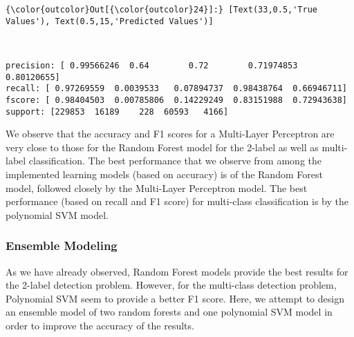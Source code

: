 \documentclass[11pt]{article}
\begin{document}
\begin{Verbatim}[commandchars=\\\{\}]
{\color{outcolor}Out[{\color{outcolor}24}]:} [Text(33,0.5,'True Values'), Text(0.5,15,'Predicted Values')]
\end{Verbatim}
            
    \begin{center}
    \end{center}
    { \hspace*{\fill} \\}
    
    \begin{Verbatim}[commandchars=\\\{\}]
precision: [ 0.99566246  0.64        0.72        0.71974853  0.80120655]
recall: [ 0.97269559  0.0039533   0.07894737  0.98438764  0.66946711]
fscore: [ 0.98404503  0.00785806  0.14229249  0.83151988  0.72943638]
support: [229853  16189    228  60593   4166]

    \end{Verbatim}

    We observe that the accuracy and F1 scores for a Multi-Layer Perceptron
are very close to those for the Random Forest model for the 2-label as
well as multi-label classification. The best performance that we observe
from among the implemented learning models (based on accuracy) is of the
Random Forest model, followed closely by the Multi-Layer Perceptron
model. The best performance (based on recall and F1 score) for
multi-class classification is by the polynomial SVM model.

    \subsubsection{Ensemble Modeling}\label{ensemble-modeling}

As we have already observed, Random Forest models provide the best
results for the 2-label detection problem. However, for the multi-class
detection problem, Polynomial SVM seem to provide a better F1 score.
Here, we attempt to design an ensemble model of two random forests and
one polynomial SVM model in order to improve the accuracy of the
results.
\end{document}
